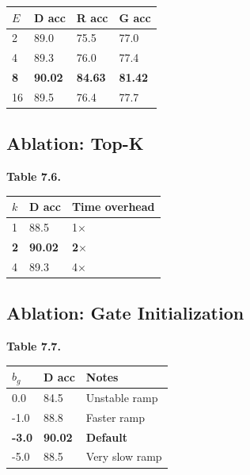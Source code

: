 \begin{table}[H]
\centering
\small
\begin{tabular}{llll}
\toprule
\textbf{$E$} & \textbf{D acc} & \textbf{R acc} & \textbf{G acc} \\
\midrule
2 & 89.0 & 75.5 & 77.0 \\
4 & 89.3 & 76.0 & 77.4 \\
\textbf{8} & \textbf{90.02} & \textbf{84.63} & \textbf{81.42} \\
16 & 89.5 & 76.4 & 77.7 \\
\bottomrule
\end{tabular}
\end{table}

\subsection{Ablation: Top-K}

\textbf{Table 7.6.}

\begin{table}[H]
\centering
\small
\begin{tabular}{lll}
\toprule
\textbf{$k$} & \textbf{D acc} & \textbf{Time overhead} \\
\midrule
1 & 88.5 & 1$\times$ \\
\textbf{2} & \textbf{90.02} & \textbf{2$\times$} \\
4 & 89.3 & 4$\times$ \\
\bottomrule
\end{tabular}
\end{table}

\subsection{Ablation: Gate Initialization}

\textbf{Table 7.7.}

\begin{table}[H]
\centering
\small
\begin{tabular}{lll}
\toprule
\textbf{$b_g$} & \textbf{D acc} & \textbf{Notes} \\
\midrule
0.0 & 84.5 & Unstable ramp \\
-1.0 & 88.8 & Faster ramp \\
\textbf{-3.0} & \textbf{90.02} & \textbf{Default} \\
-5.0 & 88.5 & Very slow ramp \\
\bottomrule
\end{tabular}
\end{table}

